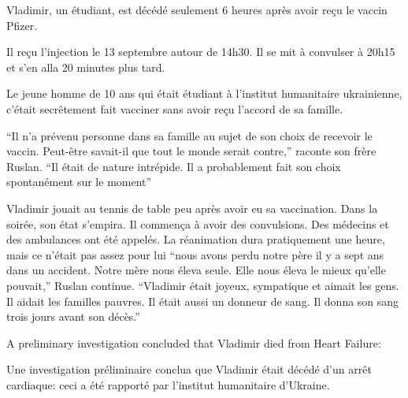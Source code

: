 Vladimir, un étudiant, est décédé seulement 6 heures après avoir reçu le vaccin
Pfizer.

Il reçu l'injection le 13 septembre autour de 14h30. Il se mit à convulser à
20h15 et s'en alla 20 minutes plus tard.

Le jeune homme de 10 ans qui était étudiant à l'institut humanitaire
ukrainienne, c'était secrêtement fait vacciner sans avoir reçu l'accord de sa
famille.

“Il n'a prévenu personne dans sa famille au sujet de son choix de recevoir le
vaccin. Peut-être savait-il que tout le monde serait contre,” raconte son frère
Ruslan. “Il était de nature intrépide. Il a probablement fait son choix
spontanément sur le moment”

Vladimir jouait au tennis de table peu après avoir eu sa vaccination. Dans la
soirée, son état s'empira. Il commença à avoir des convulsions. Des médecins et
des ambulances ont été appelés. La réanimation dura pratiquement une heure, mais
ce n'était pas assez pour lui “nous avons perdu notre père il y a sept ans dans
un accident. Notre mère nous éleva seule. Elle nous éleva le mieux qu'elle
pouvait,” Ruslan continue. “Vladimir était joyeux, sympatique et aimait les
gens. Il aidait les familles pauvres. Il était aussi un donneur de sang. Il
donna son sang trois jours avant son décès.”

A preliminary investigation concluded that Vladimir died from Heart Failure:

Une investigation préliminaire conclua que Vladimir était décédé d'un arrêt
cardiaque: ceci a été rapporté par l'institut humanitaire d'Ukraine.

